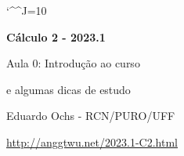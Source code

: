 \documentclass[oneside,12pt]{article}
\begin{document}


\def\u#1{\par{\footnotesize \url{#1}}}

\def\drafturl{http://anggtwu.net/LATEX/2023-1-C2.pdf}
\def\drafturl{http://anggtwu.net/2023.1-C2.html}
\def\draftfooter{\tiny \href{\drafturl}{\jobname{}} \ColorBrown{\shorttoday{} \hours}}

\def\asf#1{〈\textsf{#1}〉}
\def\Expr{\asf{expr}}
\def\Just{\quad\asf{justificativa}}

\catcode`\^^J=10

\def\Caurl   #1{\expr{Caurl("#1")}}
\def\Cahref#1#2{\href{\Caurl{#1}}{#2}}
\def\Ca      #1{\Cahref{#1}{#1}}
\pu




%

\thispagestyle{empty}

\begin{center}

\vspace*{1.2cm}

{\bf \Large Cálculo 2 - 2023.1}

\bsk

Aula 0: Introdução ao curso

e algumas dicas de estudo

\bsk

Eduardo Ochs - RCN/PURO/UFF

\url{http://anggtwu.net/2023.1-C2.html}

\end{center}
\end{document}
